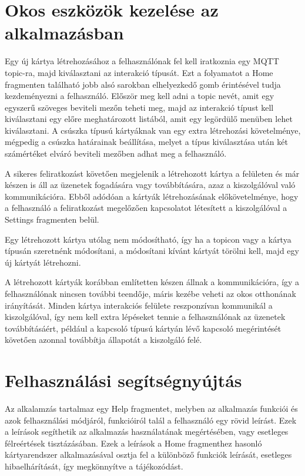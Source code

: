 \documentclass[
]{thesis-ekf}
\theoremstyle{definition}
\theoremstyle{remark}
\begin{document}
\section{Okos eszközök kezelése az alkalmazásban}
Egy új kártya létrehozásához a felhasználónak fel kell iratkoznia egy MQTT topic-ra, majd kiválasztani az interakció
típusát. Ezt a folyamatot a Home fragmenten található jobb alsó sarokban elhelyezkedő gomb érintésével
tudja kezdeményezni a felhasználó. Először meg kell adni a topic nevét, amit egy egyszerű szöveges beviteli mezőn
teheti meg, majd az interakció típust kell kiválasztani egy előre meghatározott listából, amit egy legördülő
menüben lehet kiválasztani. A csúszka típusú kártyáknak van egy extra létrehozási követelménye, mégpedig a
csúszka határainak beállítása, melyet a típus kiválasztása után két számértéket elváró beviteli mezőben adhat
meg a felhasználó.

A sikeres feliratkozást követően megjelenik a létrehozott kártya a felületen és már készen is áll az üzenetek
fogadására vagy továbbítására, azaz a kiszolgálóval való kommunikációra. Ebből adódóan a kártyák létrehozásának
előkövetelménye, hogy a felhasználó a feliratkozást megelőzően kapcsolatot létesített a kiszolgálóval a Settings 
fragmenten belül.

Egy létrehozott kártya utólag nem módosítható, így ha a topicon vagy a kártya típusán szeretnénk módosítani,
a módosítani kívánt kártyát törölni kell, majd egy új kártyát létrehozni.

A létrehozott kártyák korábban említetten készen állnak a kommunikációra, így a felhasználónak nincsen további teendője,
máris kezébe veheti az okos otthonának irányítását. Minden kártya interakciós felülete reszponzívan kommunikál
a kiszolgálóval, így nem kell extra lépéseket tennie a felhasználónak az üzenetek továbbításáért, például a kapcsoló
típusú kártyán lévő kapcsoló megérintését követően azonnal továbbítja állapotát a kiszolgáló felé.

\section{Felhasználási segítségnyújtás}
Az alkalamzás tartalmaz egy Help fragmentet, melyben az alkalmazás funkciói és azok felhasználási módjáról,
funkcióiról talál a felhasználó egy rövid leírást. Ezek a leírások segíthetik az alkalmazás használatának
megértésében, vagy esetleges félreértések tisztázásában. Ezek a leírások a Home fragmenthez hasonló kártyarendszer
alkalmazásával osztja fel a különböző funkciók leírását, esetleges hibaelhárítását, így megkönnyítve a tájékozódást.
\end{document}
